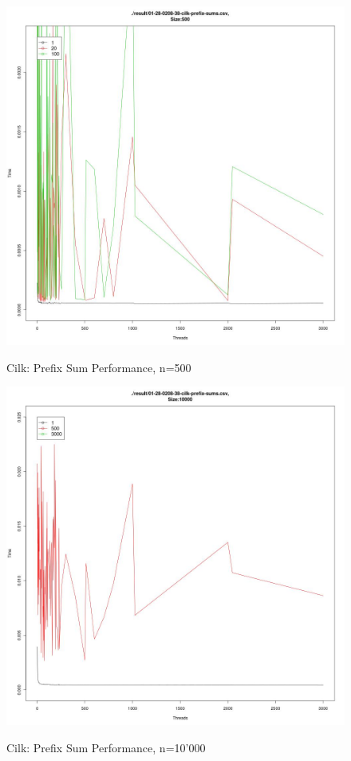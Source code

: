 \documentclass[12pt]{article}
\begin{document}
\begin{figure}[H]
\centering
\caption{Cilk: Prefix Sum Performance, n=500}

\includegraphics[scale=0.3]{candidate-graphs/cilk_by_threads_500.jpg}
\label{cilk_500}
\end{figure}

\begin{figure}[H]
\centering
\caption{Cilk: Prefix Sum Performance, n=10'000}

\includegraphics[scale=0.3]{candidate-graphs/cilk_by_threads_10000.jpg}
\label{cilk_10000}
\end{figure}
\end{document}
